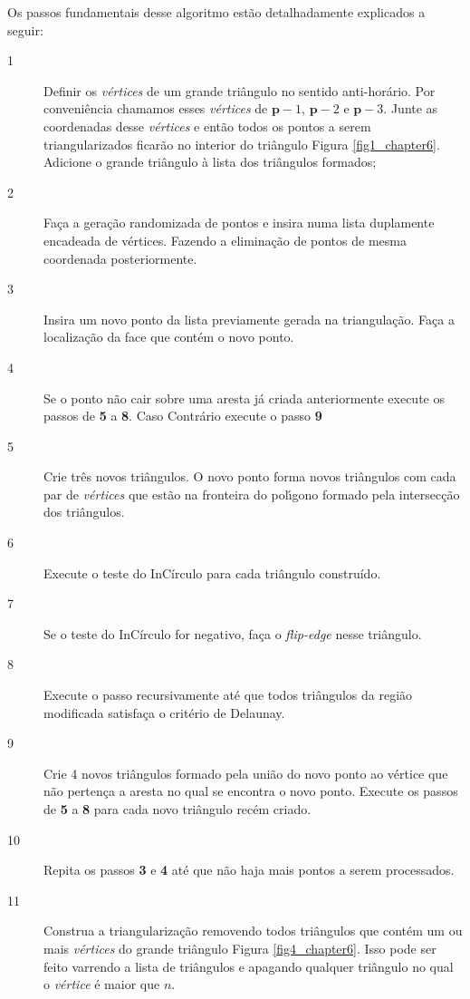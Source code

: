 \documentclass[12pt,a4paper]{book}
\begin{document}
Os passos fundamentais desse algoritmo est\~{a}o detalhadamente explicados a seguir:

\begin{description}
\item[1] Definir os \textit{v\'{e}rtices} de um grande tri\^{a}ngulo no sentido
anti-hor\'{a}rio. Por conveni\^{e}ncia chamamos esses \textit{v\'{e}rtices} de ${\mathbf p}-1$, ${\mathbf p}-2$ e ${\mathbf p}-3$. Junte as coordenadas desse \textit{v\'{e}rtices} e ent\~{a}o todos os pontos a serem triangularizados ficar\~{a}o no interior do tri\^{a}ngulo Figura \ref{fig1_chapter6}. Adicione o grande tri\^{a}ngulo \`{a}
lista dos tri\^{a}ngulos formados;

\item[2] Fa\c{c}a a gera\c{c}\~{a}o randomizada de pontos e insira numa lista duplamente encadeada de v\'ertices. Fazendo a elimina\c{c}\~{a}o de pontos de mesma coordenada posteriormente.

\item[3] Insira um novo ponto da lista previamente gerada na triangula\c{c}\~{a}o. Fa\c{c}a a localiza\c{c}\~{a}o da face que cont\'em o novo ponto.

\item[4] Se o ponto n\~ao cair sobre uma aresta j\'a criada anteriormente execute os passos de \textbf{5} a \textbf{8}. Caso Contr\'ario execute o passo \textbf{9}

\item[5] Crie tr\^es novos tri\^angulos. O novo ponto forma novos tri\^{a}ngulos com cada par de \textit{v\'{e}rtices} que est\~{a}o na fronteira do pol\'{\i}gono formado pela intersec\c{c}\~{a}o dos tri\^{a}ngulos.

\item[6] Execute o teste do InC\'irculo para cada tri\^angulo constru\'ido.

\item[7] Se o teste do InC\'irculo for negativo, fa\c{c}a o \textit{flip-edge} nesse tri\^angulo. 

\item[8] Execute o passo recursivamente at\'e que todos tri\^angulos da regi\~ao modificada satisfa\c{c}a o crit\'erio de Delaunay.

\item[9] Crie 4 novos tri\^angulos formado pela uni\~ao do novo ponto ao v\'ertice que n\~ao perten\c{c}a a aresta no qual se encontra o novo ponto. Execute os passos de \textbf{5} a \textbf{8} para cada novo tri\^angulo rec\'em criado.

\item[10] Repita os passos \textbf{3} e \textbf{4} at\'e que n\~ao haja mais pontos a serem processados.

\item[11] Construa a triangulariza\c{c}\~{a}o removendo todos tri\^{a}ngulos que cont\'{e}m um ou mais \textit{v\'{e}rtices} do grande tri\^{a}ngulo  Figura \ref{fig4_chapter6}. Isso pode ser feito varrendo a lista de tri\^{a}ngulos e apagando qualquer tri\^{a}ngulo no qual o \textit{v\'{e}rtice} \'{e} maior que $n$.
\end{description}
\end{document}
